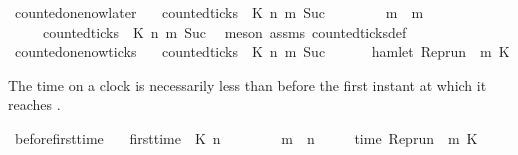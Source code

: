 \begin{isabellebody}
\isanewline
{}\isamarkupfalse%
\ counted{\isacharunderscore}one{\isacharunderscore}now{\isacharunderscore}later{\isacharcolon}\isanewline
\ \ \ {\isacartoucheopen}counted{\isacharunderscore}ticks\ {\isasymrho}\ K\ n\ m\ {\isacharparenleft}Suc\ {}{\isacharparenright}{\isacartoucheclose}\isanewline
\ \ \ \ \ \ \ {\isacartoucheopen}m{\isacharprime}\ {\isachargreater}\ m{\isacartoucheclose}\isanewline
\ \ \ \ \ {\isacartoucheopen}{\isasymnot}counted{\isacharunderscore}ticks\ {\isasymrho}\ K\ n\ m{\isacharprime}\ {\isacharparenleft}Suc\ {}{\isacharparenright}{\isacartoucheclose}\isanewline
%
\isadelimproof
%
\endisadelimproof
%
\isatagproof
{}\isamarkupfalse%
\ {\isacharparenleft}meson\ assms\ counted{\isacharunderscore}ticks{\isacharunderscore}def{\isacharparenright}%
\endisatagproof
{\isafoldproof}%
%
\isadelimproof
\isanewline
%
\endisadelimproof
\isanewline
{}\isamarkupfalse%
\ counted{\isacharunderscore}one{\isacharunderscore}now{\isacharunderscore}ticks{\isacharcolon}\isanewline
\ \ \ {\isacartoucheopen}counted{\isacharunderscore}ticks\ {\isasymrho}\ K\ n\ m\ {\isacharparenleft}Suc\ {}{\isacharparenright}{\isacartoucheclose}\isanewline
\ \ \ \ \ {\isacartoucheopen}hamlet\ {\isacharparenleft}{\isacharparenleft}Rep{\isacharunderscore}run\ {\isasymrho}{\isacharparenright}\ m\ K{\isacharparenright}{\isacartoucheclose}\isanewline
%
\isadelimproof
%
\endisadelimproof
%
\isatagproof
{}\isamarkupfalse%
%
\endisatagproof
{\isafoldproof}%
%
\isadelimproof
%
\endisadelimproof
%
\begin{isamarkuptext}%
The time on a clock is necessarily less than \isa{{\isasymtau}} before the first instant
  at which it reaches \isa{{\isasymtau}}.%
\end{isamarkuptext}\isamarkuptrue%
\isamarkupfalse%
\ before{\isacharunderscore}first{\isacharunderscore}time{\isacharcolon}\isanewline
\ \ \ {\isacartoucheopen}first{\isacharunderscore}time\ {\isasymrho}\ K\ n\ {\isasymtau}{\isacartoucheclose}\isanewline
\ \ \ \ \ \ \ {\isacartoucheopen}m\ {\isacharless}\ n{\isacartoucheclose}\isanewline
\ \ \ \ \ {\isacartoucheopen}time\ {\isacharparenleft}{\isacharparenleft}Rep{\isacharunderscore}run\ {\isasymrho}{\isacharparenright}\ m\ K{\isacharparenright}\ {\isacharless}\ {\isasymtau}{\isacartoucheclose}\isanewline
%
\isadelimproof
%
\endisadelimproof
%
\isatagproof

\end{isabellebody}
